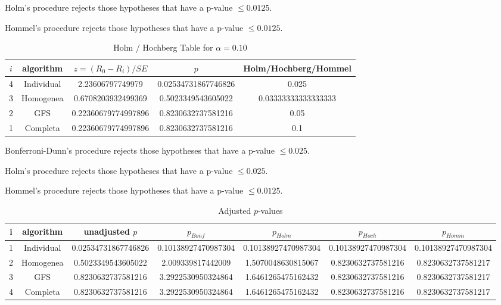 \documentclass[a4paper,10pt]{article}
\begin{document}
\begin{landscape}
Holm's procedure rejects those hypotheses that have a p-value $\le0.0125$.


Hommel's procedure rejects those hypotheses that have a p-value $\le0.0125$.


\begin{table}[!htp]
\centering\tiny
\caption{Holm / Hochberg Table for $\alpha=0.10$}
\begin{tabular}{ccccc}
$i$&algorithm&$z=(R_0 - R_i)/SE$&$p$&Holm/Hochberg/Hommel\\
\hline
4&Individual&2.23606797749979&0.02534731867746826&0.025\\
3&Homogenea&0.6708203932499369&0.5023349543605022&0.03333333333333333\\
2&GFS&0.22360679774997896&0.8230632737581216&0.05\\
1&Completa&0.22360679774997896&0.8230632737581216&0.1\\
\hline
\end{tabular}
\end{table}
Bonferroni-Dunn's procedure rejects those hypotheses that have a p-value $\le0.025$.


Holm's procedure rejects those hypotheses that have a p-value $\le0.025$.


Hommel's procedure rejects those hypotheses that have a p-value $\le0.0125$.


\begin{table}[!htp]
\centering\tiny
\caption{Adjusted $p$-values}
\begin{tabular}{ccccccc}
i&algorithm&unadjusted $p$&$p_{Bonf}$&$p_{Holm}$&$p_{Hoch}$&$p_{Homm}$\\
\hline
1&Individual&0.02534731867746826&0.10138927470987304&0.10138927470987304&0.10138927470987304&0.10138927470987304\\
2&Homogenea&0.5023349543605022&2.009339817442009&1.5070048630815067&0.8230632737581216&0.8230632737581217\\
3&GFS&0.8230632737581216&3.2922530950324864&1.6461265475162432&0.8230632737581216&0.8230632737581217\\
4&Completa&0.8230632737581216&3.2922530950324864&1.6461265475162432&0.8230632737581216&0.8230632737581217\\
\hline
\end{tabular}
\end{table}


\end{landscape}
\end{document}

